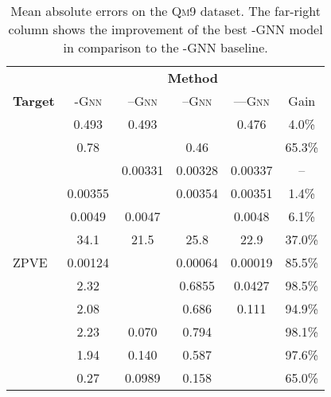 \documentclass[letterpaper]{article}
\theoremstyle{definition}
\begin{document}
\begin{table*}[t]\
	\caption{Mean absolute errors on the \textsc{Qm9} dataset. The far-right column shows the improvement of the best -GNN model in comparison to the -GNN baseline.
	}\label{fig:qm9_results}
	\renewcommand{\arraystretch}{1.0}
	\centering
	\begin{tabular}{lccccc}
		\toprule
		\multirow{3}{*}{\vspace*{8pt}\textbf{Target}} & \multicolumn{5}{c}{\textbf{Method}} \\
		\cmidrule{2-6}
		&   \textsc{-Gnn}   & \!\textsc{--Gnn} & \textsc{--Gnn} & \textsc{---Gnn}\! & Gain   \\
		\midrule
		                                      & 0.493              & 0.493                  &      & 0.476                      & 4.0\%  \\
		                                                   & 0.78               &         & 0.46                 &             & 65.3\% \\
		            &  & 0.00331                & 0.00328              & 0.00337                    & --     \\
		                  & 0.00355            &      & 0.00354              & 0.00351                    & 1.4\%  \\
		                           & 0.0049             & 0.0047                 &     & 0.0048                     & 6.1\%  \\
		                       & 34.1               & 21.5                   & 25.8                 & 22.9                       & 37.0\% \\
		\textsc{ZPVE}                      & 0.00124            &      & 0.00064              & 0.00019                    & 85.5\% \\
		                                         & 2.32               &       & 0.6855               & 0.0427                     & 98.5\% \\
		                                                 & 2.08               &        & 0.686                & 0.111                      & 94.9\% \\
		                                                      & 2.23               & 0.070                  & 0.794                &           & 98.1\% \\
		                                              & 1.94               & 0.140                  & 0.587                &           & 97.6\% \\
		                                & 0.27               & 0.0989                 & 0.158                &           & 65.0\% \\
		\bottomrule
	\end{tabular}
\end{table*}
\end{document}
